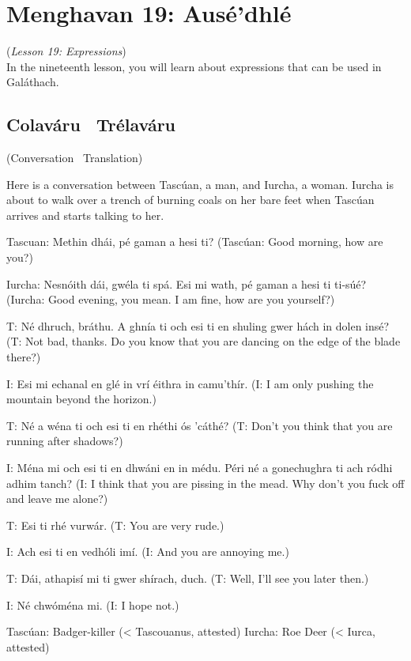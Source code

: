 \section{Menghavan 19: Aus\'{e'}dhl\'{e}}
(\textit{Lesson 19: Expressions})\\

In the nineteenth lesson, you will learn about expressions that can be used in Gal\'{a}thach.

\subsection{Colav\'{a}ru \textendash\ Tr\'{e}lav\'{a}ru}
(Conversation \textendash\ Translation)

Here is a conversation between Tasc\'{u}an, a man, and Iurcha, a woman. Iurcha is about to walk over a trench of burning coals on her bare feet when Tasc\'{u}an arrives and starts talking to her.

Tascuan: Methin dh\'{a}i, p\'{e} gaman a hesi ti?
(Tasc\'{u}an: Good morning, how are you?)

Iurcha: Nesn\'{o}ith d\'{a}i, gw\'{e}la ti sp\'{a}. Esi mi wath, p\'{e} gaman a hesi ti ti-s\'{u}\'{e}?
(Iurcha: Good evening, you mean. I am fine, how are you yourself?)

T: N\'{e} dhruch, br\'{a}thu. A ghn\'{i}a ti och esi ti en shuling gwer h\'{a}ch in dolen ins\'{e}?
(T: Not bad, thanks. Do you know that you are dancing on the edge of the blade there?)

I: Esi mi echanal en gl\'{e} in vr\'{i} \'{e}ithra in camu'th\'{i}r.
(I: I am only pushing the mountain beyond the horizon.)

T: N\'{e} a w\'{e}na ti och esi ti en rh\'{e}thi \'{o}s 'c\'{a}th\'{e}?
(T: Don't you think that you are running after shadows?)

I: M\'{e}na mi och esi ti en dhw\'{a}ni en in m\'{e}du. P\'{e}ri n\'{e} a gonechughra ti ach r\'{o}dhi adhim tanch?
(I: I think that you are pissing in the mead. Why don't you fuck off and leave me alone?)

T: Esi ti rh\'{e} vurw\'{a}r.
(T: You are very rude.)

I: Ach esi ti en vedh\'{o}li im\'{i}.
(I: And you are annoying me.)

T: D\'{a}i, athapis\'{i} mi ti gwer sh\'{i}rach, duch.
(T: Well, I'll see you later then.)

I: N\'{e} chw\'{o}m\'{e}na mi.
(I: I hope not.)

Tasc\'{u}an: Badger-killer (< Tascouanus, attested)
Iurcha: Roe Deer (< Iurca, attested)

